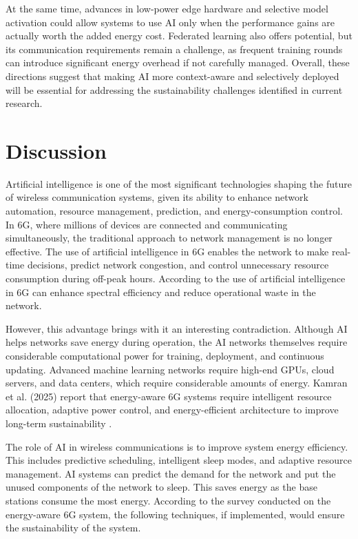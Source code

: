 \documentclass[letterpaper]{article} %
\begin{document}
At the same time, advances in low-power edge hardware and selective model activation could allow systems to use AI only when the performance gains are actually worth the added energy cost. Federated learning also offers potential, but its communication requirements remain a challenge, as frequent training rounds can introduce significant energy overhead if not carefully managed. Overall, these directions suggest that making AI more context-aware and selectively deployed will be essential for addressing the sustainability challenges identified in current research.

\section{Discussion}
Artificial intelligence is one of the most significant technologies shaping the future of wireless communication systems, given its ability to enhance network automation, resource management, prediction, and energy-consumption control. In 6G, where millions of devices are connected and communicating simultaneously, the traditional approach to network management is no longer effective. The use of artificial intelligence in 6G enables the network to make real-time decisions, predict network congestion, and control unnecessary resource consumption during off-peak hours. According to the use of artificial intelligence in 6G can enhance spectral efficiency and reduce operational waste in the network.

However, this advantage brings with it an interesting contradiction. Although AI helps networks save energy during operation, the AI networks themselves require considerable computational power for training, deployment, and continuous updating. Advanced machine learning networks require high-end GPUs, cloud servers, and data centers, which require considerable amounts of energy. Kamran et al. (2025) report that energy-aware 6G systems require intelligent resource allocation, adaptive power control, and energy-efficient architecture to improve long-term sustainability \cite{kamran_energy-aware_2025}.

The role of AI in wireless communications is to improve system energy efficiency. This includes predictive scheduling, intelligent sleep modes, and adaptive resource management. AI systems can predict the demand for the network and put the unused components of the network to sleep. This saves energy as the base stations consume the most energy. According to the survey conducted on the energy-aware 6G system, the following techniques, if implemented, would ensure the sustainability of the system.
\end{document}
